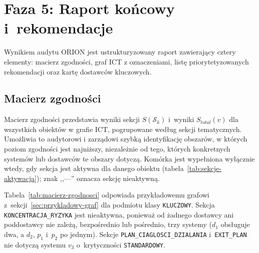 \section{Faza 5: Raport końcowy i~rekomendacje}
\label{sec:faza5}

Wynikiem audytu ORION jest ustrukturyzowany raport
zawierający cztery elementy: macierz zgodności,
graf ICT z oznaczeniami, listę priorytetyzowanych
rekomendacji oraz kartę dostawców kluczowych.

\subsection{Macierz zgodności}
\label{sec:macierz-zgodnosci}

Macierz zgodności przedstawia wyniki sekcji $S(\mathcal{S}_k)$
i~wyniki $S_{total}(v)$ dla wszystkich obiektów w grafie ICT,
pogrupowane według sekcji tematycznych. Umożliwia to audytorowi
i zarządowi szybką identyfikację obszarów,
w których poziom zgodności jest najniższy, niezależnie od tego, których konkretnych
systemów lub dostawców te obszary dotyczą. Komórka jest wypełniona
wyłącznie wtedy, gdy sekcja jest aktywna dla danego obiektu
(tabela~\ref{tab:sekcje-aktywacja}); znak ,,---'' oznacza sekcję nieaktywną.

Tabela~\ref{tab:macierz-zgodnosci} odpowiada przykładowemu grafowi
z~sekcji~\ref{sec:przykladowy-graf} dla podmiotu klasy \texttt{KLUCZOWY}.
Sekcja \texttt{KONCENTRACJA\_RYZYKA} jest nieaktywna, ponieważ od żadnego
dostawcy ani poddostawcy nie zależą, bezpośrednio lub pośrednio, trzy systemy ($d_1$ obsługuje dwa, a $d_2$, $p_1$ i~$p_2$ po jednym). Sekcje \texttt{PLAN\_CIAGLOSCI\_DZIALANIA} i~\texttt{EXIT\_PLAN}
nie dotyczą systemu $v_3$ o~krytyczności \texttt{STANDARDOWY}.

